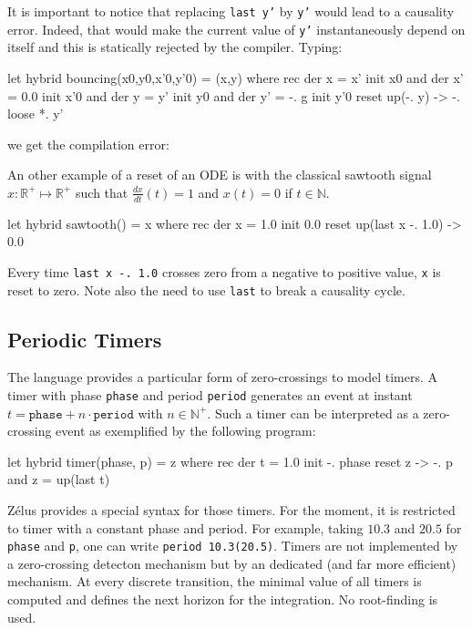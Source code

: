 \documentclass[11pt,titlepage,twoside]{report}
\newcommand{\zelus}{{\sf Z\'elus}}
\newcommand{\DotNotation}[1]{\frac{\mathit{d}{#1}}{\mathit{dt}}}
\newcommand{\bR}{\mathbb{R}}
\newcommand{\bN}{\mathbb{N}}
\newcommand{\Marc}[1]{{\bf Marc.} {#1} {\bf Fin}}
\begin{document}
It is important to notice that replacing \texttt{last y'} by
\texttt{y'} would lead to a causality error. Indeed, that would make
the current value of \texttt{y'} instantaneously depend on itself and
this is statically rejected by the compiler. Typing:
\begin{chklisting}[include=gravity,fail]
let hybrid bouncing(x0,y0,x'0,y'0) = (x,y) where
 rec der x = x' init x0
 and der x' = 0.0 init x'0
 and der y = y' init y0
 and der y' = -. g init y'0 reset up(-. y) -> -. loose *. y'
\end{chklisting}
we get the compilation error:
\chklistingerr{}


An other example of a reset of an ODE is with the classical sawtooth
signal $x: \bR^+ \mapsto \bR^+$ such that $\DotNotation{x}(t) = 1$ and
$x(t) = 0$ if $t\in\bN$.
\begin{chklisting}[withresult]
let hybrid sawtooth() = x where
  rec der x = 1.0 init 0.0 reset up(last x -. 1.0) -> 0.0
\end{chklisting}
%
Every time \texttt{last x -. 1.0} crosses zero from a negative to positive value,
\texttt{x} is reset to zero. Note also the need to use \texttt{last} to break
a causality cycle.

\subsection{Periodic Timers\label{periodictimers}} %

The language provides a particular form of zero-crossings to model
timers. A timer with phase \texttt{phase} and period \texttt{period} generates
an event at instant $t = \mathtt{phase} + n \cdot \mathtt{period}$ with
$n \in \bN^+$. Such a timer can be interpreted as a zero-crossing event as
exemplified by the following program:
\begin{chklisting}[withresult]
let hybrid timer(phase, p) = z where
  rec der t = 1.0 init -. phase reset z -> -. p
  and z = up(last t)
\end{chklisting}

\zelus{} provides a special syntax for those timers. For the moment,
it is restricted to timer with a constant phase and period. For example,
taking $10.3$ and $20.5$ for \texttt{phase} and \texttt{p}, one can
write \texttt{period 10.3(20.5)}. Timers are not implemented by a 
zero-crossing detecton mechanism
but by an dedicated (and far more efficient) mechanism. At every discrete transition,
the minimal value of all timers is computed and defines the next horizon for the
integration. No root-finding is used.
\end{document}

